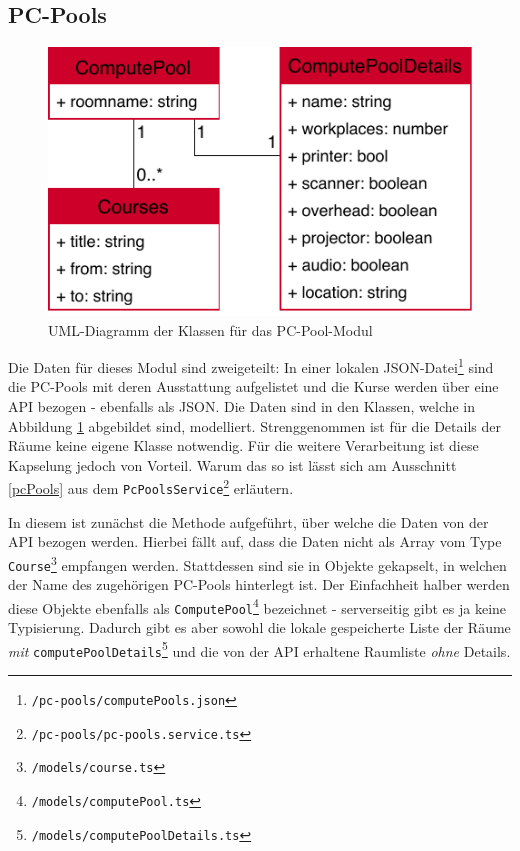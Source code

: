 \subsection{PC-Pools}
\label{sec:prog:pcpools}
\begin{figure}[h]
\centering
\includegraphics{gfx/ComputePools}
\caption{UML-Diagramm der Klassen für das PC-Pool-Modul}
\label{fig:PoolUml}
\end{figure}
Die Daten für dieses Modul sind zweigeteilt: In einer lokalen \acs{JSON}-Datei\footnote{\texttt{/pc-pools/computePools.json}} sind die PC-Pools mit deren Ausstattung aufgelistet und die Kurse werden über eine API bezogen - ebenfalls als \acs{JSON}. Die Daten sind in den Klassen, welche in Abbildung \ref{fig:PoolUml} abgebildet sind, modelliert. Strenggenommen ist für die Details der Räume keine eigene Klasse notwendig. Für die weitere Verarbeitung ist diese Kapselung jedoch von Vorteil. Warum das so ist lässt sich am Ausschnitt \ref{pcPools} aus dem \texttt{PcPoolsService}\footnote{\texttt{/pc-pools/pc-pools.service.ts}} erläutern.

In diesem ist zunächst die Methode aufgeführt, über welche die Daten von der \acs{API} bezogen werden. Hierbei fällt auf, dass die Daten nicht als Array vom Type \texttt{Course}\footnote{\texttt{/models/course.ts}} empfangen werden. Stattdessen sind sie in Objekte gekapselt, in welchen der Name des zugehörigen PC-Pools hinterlegt ist. Der Einfachheit halber werden diese Objekte ebenfalls als \texttt{ComputePool}\footnote{\texttt{/models/computePool.ts}} bezeichnet - serverseitig gibt es ja keine Typisierung. Dadurch gibt es aber sowohl die lokale gespeicherte Liste der Räume \textit{mit} \texttt{computePoolDetails}\footnote{\texttt{/models/computePoolDetails.ts}} und die von der API erhaltene Raumliste \textit{ohne} Details.

